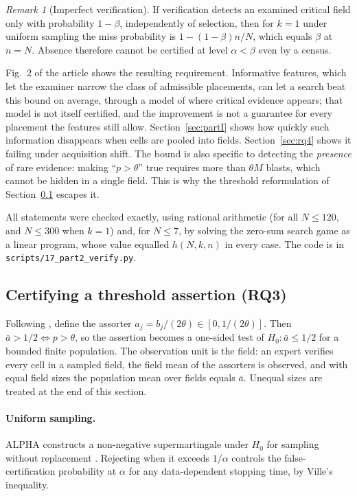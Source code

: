 \documentclass[11pt]{article}
\theoremstyle{remark}
\newtheorem{remark}{Remark}
\theoremstyle{definition}
\begin{document}
\begin{remark}[Imperfect verification]
If verification detects an examined critical field only with probability $1-\beta$, independently of selection, then for $k=1$ under uniform sampling the miss probability is $1-(1-\beta)n/N$, which equals $\beta$ at $n=N$. Absence therefore cannot be certified at level $\alpha<\beta$ even by a census.
\end{remark}

Fig.~2 of the article shows the resulting requirement. Informative features, which let the examiner narrow the class of admissible placements, can let a search beat this bound on average, through a model of where critical evidence appears; that model is not itself certified, and the improvement is not a guarantee for every placement the features still allow. Section~\ref{sec:partI} shows how quickly such information disappears when cells are pooled into fields. Section~\ref{sec:rq4} shows it failing under acquisition shift. The bound is also specific to detecting the \emph{presence} of rare evidence: making ``$p>\theta$'' true requires more than $\theta M$ blasts, which cannot be hidden in a single field. This is why the threshold reformulation of Section~\ref{sec:cert} escapes it.

All statements were checked exactly, using rational arithmetic (for all $N\le120$, and $N\le300$ when $k=1$) and, for $N\le7$, by solving the zero-sum search game as a linear program, whose value equalled $h(N,k,n)$ in every case. The code is in \texttt{scripts/17\_part2\_verify.py}.


\subsection{Certifying a threshold assertion (RQ3)}\label{sec:cert}
Following \cite{stark2023alpha}, define the assorter $a_j=b_j/(2\theta)\in[0,1/(2\theta)]$. Then $\bar a>1/2\iff p>\theta$, so the assertion becomes a one-sided test of $H_0:\bar a\le 1/2$ for a bounded finite population. The observation unit is the field: an expert verifies every cell in a sampled field, the field mean of the assorters is observed, and with equal field sizes the population mean over fields equals $\bar a$. Unequal sizes are treated at the end of this section.

\paragraph{Uniform sampling.} ALPHA constructs a non-negative supermartingale under $H_0$ for sampling without replacement \cite{stark2023alpha}. Rejecting when it exceeds $1/\alpha$ controls the false-certification probability at $\alpha$ for any data-dependent stopping time, by Ville's inequality.
\end{document}
